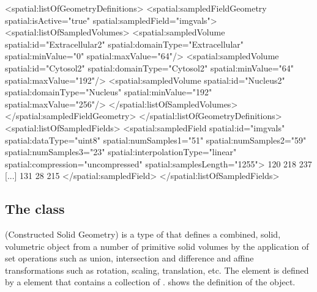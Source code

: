 \begin{example}
  <spatial:listOfGeometryDefinitions>
    <spatial:sampledFieldGeometry spatial:isActive="true" spatial:sampledField="imgvals">
      <spatial:listOfSampledVolumes>
        <spatial:sampledVolume spatial:id="Extracellular2" spatial:domainType="Extracellular"
                               spatial:minValue="0" spatial:maxValue="64"/>
        <spatial:sampledVolume spatial:id="Cytosol2" spatial:domainType="Cytosol2"
                               spatial:minValue="64" spatial:maxValue="192"/>
        <spatial:sampledVolume spatial:id="Nucleus2" spatial:domainType="Nucleus"
                               spatial:minValue="192" spatial:maxValue="256"/>
      </spatial:listOfSampledVolumes>
    </spatial:sampledFieldGeometry>
  </spatial:listOfGeometryDefinitions>
  <spatial:listOfSampledFields>
    <spatial:sampledField spatial:id="imgvals" spatial:dataType="uint8" spatial:numSamples1="51"
                          spatial:numSamples2="59" spatial:numSamples3="23"
                          spatial:interpolationType="linear" spatial:compression="uncompressed"
                          spatial:samplesLength="1255">
                                120 218 237 [...] 131 28 215
    </spatial:sampledField>
  </spatial:listOfSampledFields>
\end{example}

\subsection{The  class}
\label{csgeometry-class}
\label{listofcsgobjects-class}
\CSGeometry (Constructed Solid Geometry) is a type of \GeometryDefinition that defines a combined, solid, volumetric object from a number of primitive solid volumes by the application of set operations such as union, intersection and difference and affine transformations such as rotation, scaling, translation, etc. The \CSGeometry element is defined by a  element that contains a collection of \CSGObjects.  shows the definition of the \CSGeometry object.

